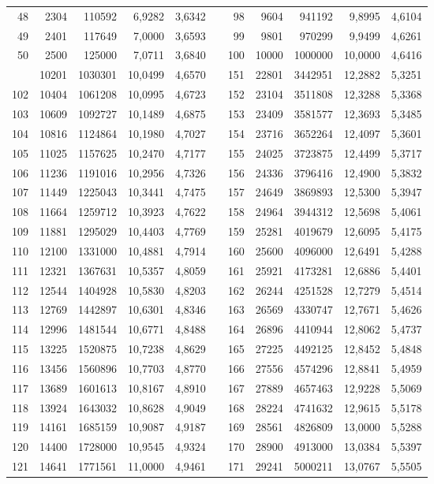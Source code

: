 \begin{longtable}{rrrrrrrrrrr}
48&2304&110592&6,9282&3,6342&&98&9604&941192&9,8995&4,6104\\
49&2401&117649&7,0000&3,6593&&99&9801&970299&9,9499&4,6261\\
50&2500&125000&7,0711&3,6840&&100&10000&1000000&10,0000&4,6416\\
\newpage
101&10201&1030301&10,0499&4,6570&&151&22801&3442951&12,2882&5,3251\\
102&10404&1061208&10,0995&4,6723&&152&23104&3511808&12,3288&5,3368\\
103&10609&1092727&10,1489&4,6875&&153&23409&3581577&12,3693&5,3485\\
104&10816&1124864&10,1980&4,7027&&154&23716&3652264&12,4097&5,3601\\
105&11025&1157625&10,2470&4,7177&&155&24025&3723875&12,4499&5,3717\\
106&11236&1191016&10,2956&4,7326&&156&24336&3796416&12,4900&5,3832\\
107&11449&1225043&10,3441&4,7475&&157&24649&3869893&12,5300&5,3947\\
108&11664&1259712&10,3923&4,7622&&158&24964&3944312&12,5698&5,4061\\
109&11881&1295029&10,4403&4,7769&&159&25281&4019679&12,6095&5,4175\\
110&12100&1331000&10,4881&4,7914&&160&25600&4096000&12,6491&5,4288\\
111&12321&1367631&10,5357&4,8059&&161&25921&4173281&12,6886&5,4401\\
112&12544&1404928&10,5830&4,8203&&162&26244&4251528&12,7279&5,4514\\
113&12769&1442897&10,6301&4,8346&&163&26569&4330747&12,7671&5,4626\\
114&12996&1481544&10,6771&4,8488&&164&26896&4410944&12,8062&5,4737\\
115&13225&1520875&10,7238&4,8629&&165&27225&4492125&12,8452&5,4848\\
116&13456&1560896&10,7703&4,8770&&166&27556&4574296&12,8841&5,4959\\
117&13689&1601613&10,8167&4,8910&&167&27889&4657463&12,9228&5,5069\\
118&13924&1643032&10,8628&4,9049&&168&28224&4741632&12,9615&5,5178\\
119&14161&1685159&10,9087&4,9187&&169&28561&4826809&13,0000&5,5288\\
120&14400&1728000&10,9545&4,9324&&170&28900&4913000&13,0384&5,5397\\
121&14641&1771561&11,0000&4,9461&&171&29241&5000211&13,0767&5,5505\\

\end{longtable}
